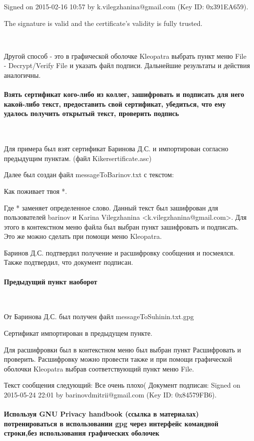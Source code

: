\documentclass{article}
\begin{document}
Signed on 2015-02-16 10:57 by k.vilegzhanina@gmail.com (Key ID: 0x391EA659).

The signature is valid and the certificate's validity is fully trusted.

~

Другой способ - это в графической оболочке Kleopatra выбрать пункт меню File - Decrypt/Verify File и указать файл подписи. Дальнейшие результаты и действия аналогичны.

\paragraph{Взять сертификат кого-либо из коллег, зашифровать и подписать для него какой-либо текст, предоставить свой сертификат, убедиться, что ему удалось получить открытый текст, проверить подпись}
~

Для примера был взят сертификат Баринова Д.С. и импортирован согласно предыдущим пунктам. (файл Kikersertificate.asc)

Далее был создан файл messageToBarinov.txt с текстом:

Как поживает твоя *.

Где * заменяет определенное слово. Данный текст был зашифрован для пользователей barinov и Karina Vilegzhanina <k.vilegzhanina@gmail.com>. Для этого в контекстном меню файла был выбран пункт зашифровать и подписать. Это же можно сделать при помощи меню Kleopatra.

Баринов Д.С. подтвердил получение и расшифровку сообщения и посмеялся. Также подтвердил, что документ подписан.

\paragraph{Предыдущий пункт наоборот}
~

От Баринова Д.С. был получен файл messageToSuhinin.txt.gpg

Сертификат импортирован в предыдущем пункте.

Для расшифровки был в контекстном меню был выбран пункт Расшифровать и проверить. Расшифровку можно провести также и при помощи графической оболочки Kleopatra выбрав соответствующий пункт меню File.

Текст сообщения следующий: Все очень плохо(
Документ подписан: Signed on 2015-05-24 22:01 by barinovdmitrii@gmail.com (Key ID: 0x84579FB6).

\paragraph{Используя GNU Privacy handbook (ссылка в материалах) потренироваться в использовании gpg через интерфейс командной строки,без использования графических оболочек}
~
\end{document}
